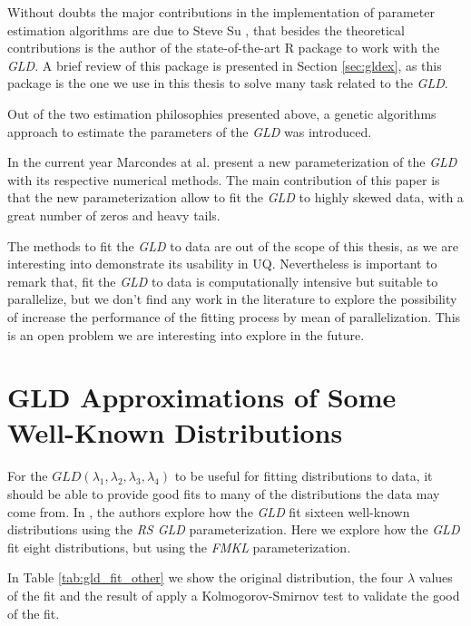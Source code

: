 Without doubts the major contributions in the implementation of parameter estimation algorithms are due to Steve Su \cite{Su2007, Su2011, Su2015, Su2016}, that besides the theoretical contributions is the author of the state-of-the-art R package to work with the \textit{GLD}. A brief review of this package is presented in Section \ref{sec:gldex}, as this package is the one we use in this thesis to solve many task related to the \textit{GLD}.

Out of the two estimation philosophies presented above, \cite{Corlu2016} a genetic algorithms approach to estimate the parameters of the \textit{GLD} was introduced. 

In the current year Marcondes at al. \cite{Marcondes2018} present a new parameterization of the \textit{GLD} with its respective numerical methods. The main contribution of this paper is that the new parameterization allow to fit the \textit{GLD} to highly skewed data, with a great number of zeros and heavy tails.

The methods to fit the \textit{GLD} to data are out of the scope of this thesis, as we are interesting into demonstrate its usability in UQ. Nevertheless is important to remark that, fit the \textit{GLD} to data is computationally intensive but suitable to parallelize, but we don't find any work in the literature to explore the possibility of increase the performance of the fitting process by mean of parallelization. This is an open problem we are interesting into explore in the future.    

\section{GLD Approximations of Some Well-Known Distributions}\label{sec:gld_fit_other}
For the $GLD(\lambda_{1}, \lambda_{2}, \lambda_{3}, \lambda_{4})$ to be useful for fitting distributions to data, it should be able to provide good fits to many of the distributions the data may come from. In \cite{Karian2011}, the authors explore how the \textit{GLD} fit sixteen well-known distributions using the \textit{RS GLD} parameterization. Here we explore how the \textit{GLD} fit eight distributions, but using the \textit{FMKL} parameterization.

In Table \ref{tab:gld_fit_other} we show the original distribution, the four $\lambda$ values of the fit and the result of apply a Kolmogorov-Smirnov test to validate the good of the fit.

